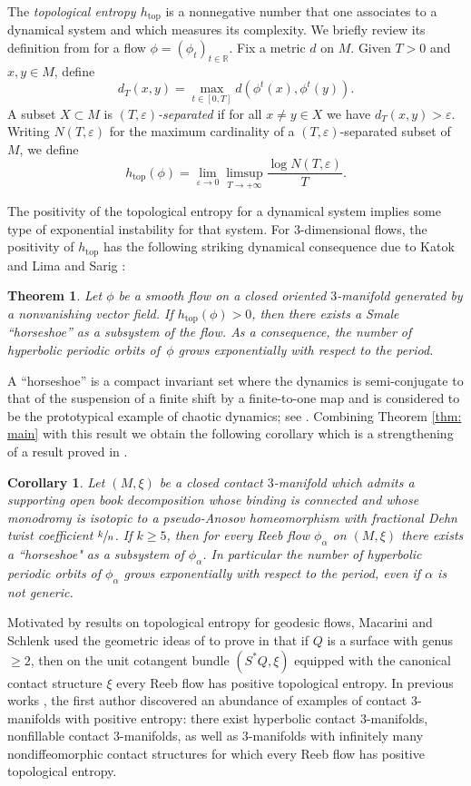 \documentclass[10pt]{amsart}
\let\epsilon\varepsilon
\renewcommand{\top}{\mathrm{top}}
\theoremstyle{plain}
\newtheorem*{thm*}{Theorem}
\newtheorem{cor}[thm]{Corollary}
\theoremstyle{definition}
\numberwithin{equation}{subsection}
\newcommand{\RR}{\mathbb{R}}
\begin{document}
The {\em topological entropy $h_{\top}$} is a nonnegative number that one associates to a dynamical system and which measures its complexity. We briefly review its definition from \cite{Bo} for a flow $\phi=(\phi_t)_{t\in \RR}$. Fix a metric $d$ on $M$. Given $T>0$ and $x,y\in M$, define
$$d_T(x,y)=\max_{t\in[0,T]} d(\phi^t(x),\phi^t(y)).$$
A subset $X\subset M$ is {\em $(T,\epsilon)$-separated} if for all $x \neq y\in X$ we have $d_T(x,y)>\epsilon$. Writing $N(T,\epsilon)$ for the maximum cardinality of a $(T,\epsilon)$-separated subset of $M$, we define
$$h_{\top}(\phi)=\lim_{\epsilon\to 0}\limsup_{T\to +\infty} \frac{\log N(T,\epsilon)}{T}.$$

The positivity of the topological entropy for a dynamical system implies some type of exponential instability for that system. For $3$-dimensional flows, the positivity of $h_{\top}$ has the following striking dynamical consequence due to Katok \cite{Katok,K2} and Lima and Sarig \cite{LS,S}:

\begin{thm*}
Let $\phi$ be a smooth flow on a closed oriented $3$-manifold generated by a nonvanishing vector field. If $h_{\top}(\phi)>0$, then there exists a Smale ``horseshoe'' as a subsystem of the flow. As a consequence, the number of hyperbolic periodic orbits of~$\phi$ grows exponentially with respect to the period.
\end{thm*}

A ``horseshoe'' is a compact invariant set where the dynamics is semi-conjugate to that of the suspension of a finite shift by a finite-to-one map and is considered to be the prototypical example of chaotic dynamics; see \cite{KH}.
Combining Theorem \ref{thm: main} with this result we obtain the following corollary which is a strengthening of a result proved in \cite{CH2}.

\begin{cor}
Let $(M,\xi)$ be a closed contact $3$-manifold which admits a supporting open book decomposition whose binding is connected and whose monodromy is isotopic to a pseudo-Anosov homeomorphism with fractional Dehn twist coefficient $\sfrac{k}{n}$. If $k\geq 5$, then for every Reeb flow $\phi_\alpha$ on $(M,\xi)$ there exists a ``horseshoe" as a subsystem of $\phi_\alpha$. In particular the number of hyperbolic periodic orbits of $\phi_\alpha$ grows exponentially with respect to the period, even if $\alpha$ is not generic.
\end{cor}

Motivated by results on topological entropy for geodesic flows, Macarini and Schlenk used the geometric ideas of \cite{FS1,FS2} to prove in \cite{MS} that if $Q$ is a surface with genus $\geq 2$, then on the unit cotangent bundle $(S^{*}Q, \xi)$ equipped with the canonical contact structure $\xi$ every Reeb flow has positive topological entropy. In previous works \cite{A,Al,ReebAnosov}, the first author discovered an abundance of examples of contact $3$-manifolds with positive entropy: there exist hyperbolic contact $3$-manifolds, nonfillable contact $3$-manifolds, as well as $3$-manifolds with infinitely many nondiffeomorphic contact structures for which every Reeb flow has positive topological entropy.
\end{document}
